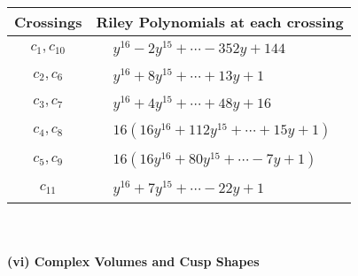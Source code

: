 \documentclass[1p]{elsarticle_modified}
\theoremstyle{definition}
\begin{document}
\begin{tabular}{m{50pt}|m{274pt}}
Crossings & \hspace{64pt}Riley Polynomials at each crossing \\
\hline $$\begin{aligned}c_{1},c_{10}\end{aligned}$$&$\begin{aligned}
&y^{16}-2 y^{15}+\cdots-352 y+144
\end{aligned}$\\
\hline $$\begin{aligned}c_{2},c_{6}\end{aligned}$$&$\begin{aligned}
&y^{16}+8 y^{15}+\cdots+13 y+1
\end{aligned}$\\
\hline $$\begin{aligned}c_{3},c_{7}\end{aligned}$$&$\begin{aligned}
&y^{16}+4 y^{15}+\cdots+48 y+16
\end{aligned}$\\
\hline $$\begin{aligned}c_{4},c_{8}\end{aligned}$$&$\begin{aligned}
&16(16 y^{16}+112 y^{15}+\cdots+15 y+1)
\end{aligned}$\\
\hline $$\begin{aligned}c_{5},c_{9}\end{aligned}$$&$\begin{aligned}
&16(16 y^{16}+80 y^{15}+\cdots-7 y+1)
\end{aligned}$\\
\hline $$\begin{aligned}c_{11}\end{aligned}$$&$\begin{aligned}
&y^{16}+7 y^{15}+\cdots-22 y+1
\end{aligned}$\\
\hline
\end{tabular}\\~\\
\newpage\flushleft \textbf{(vi) Complex Volumes and Cusp Shapes}
\end{document}
